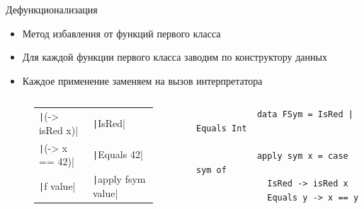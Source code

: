     \begin{frame}[fragile]{Дефункционализация}
        \begin{itemize}
            \item Метод избавления от функций первого класса
            \item Для каждой функции первого класса заводим по конструктору данных
            \item Каждое применение заменяем на вызов интерпретатора
        \end{itemize}
        \begin{columns}[onlytextwidth]
            \begin{column}{0.485\textwidth}
                \begin{figure}[h]
                    \centering
                    \begin{tabular}{ll}
                        \texttt|(\x -> isRed x)| & \texttt|IsRed| \\
                        \texttt|(\x -> x == 42)| & \texttt|Equals 42| \\
                        \texttt|f value| & \texttt|apply fsym value|
                    \end{tabular}
                \end{figure}
            \end{column}\hfill%
            \begin{column}{0.485\textwidth}
                \begin{verbatim}
            data FSym = IsRed | Equals Int

            apply sym x = case sym of
              IsRed -> isRed x
              Equals y -> x == y
                \end{verbatim}
            \end{column}
        \end{columns}
    \end{frame}

